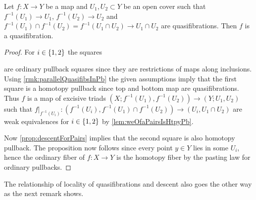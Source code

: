 \begin{corollary}\label{cor:locOfQuasifib}
    Let $f\colon X\to Y$ be a map and $U_1, U_2\subset Y$ be an open cover such that $f^{-1}(U_1)\to U_1$, $f^{-1}(U_2)\to U_2$ and $f^{-1}(U_1)\cap f^{-1}(U_2)=f^{-1}(U_1\cap U_2)\to U_1\cap U_2$ are quasifibrations.
    Then $f$ is a quasifibration.
    \begin{proof}
        For $i\in\left\lbrace1,2\right\rbrace$ the squares 
        \begin{center}
        \end{center} 
        are ordinary pullback squares since they are restrictions of maps along inclusions.
        Using \cref{rmk:parallelQuasifibsInPb} the given assumptions imply that the first square is a homotopy pullback since top and bottom map are quasifibrations.
        Thus $f$ is a map of excisive triads $(X;f^{-1}(U_1),f^{-1}(U_2))\to(Y;U_1,U_2)$ such that $f|_{f^{-1}(U_i)}\colon(f^{-1}(U_i),f^{-1}(U_1)\cap f^{-1}(U_2))\to (U_i,U_1\cap U_2)$ are weak equivalences for $i\in\left\lbrace1,2\right\rbrace$ by \cref{lem:weOfaPairsIsHtpyPb}.

        Now \cref{prop:descentForPairs} implies that the second square is also homotopy pullback.
        The proposition now follows since every point $y\in Y$ lies in some $U_i$, hence the ordinary fiber of $f\colon X\to Y$ is the homotopy fiber by the pasting law for ordinary pullbacks.
    \end{proof}
\end{corollary}
The relationship of locality of quasifibrations and descent also goes the other way as the next remark shows.
